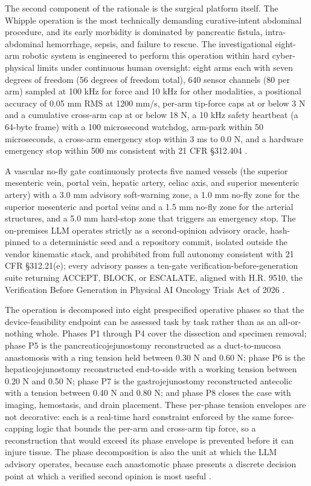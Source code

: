 The second component of the rationale is the surgical platform itself. The Whipple
operation is the most technically demanding curative-intent abdominal procedure, and
its early morbidity is dominated by pancreatic fistula, intra-abdominal hemorrhage,
sepsis, and failure to rescue. The investigational eight-arm robotic system is
engineered to perform this operation within hard cyber-physical limits under
continuous human oversight: eight arms each with seven degrees of freedom (56
degrees of freedom total), 640 sensor channels (80 per arm) sampled at 100 kHz for
force and 10 kHz for other modalities, a positional accuracy of 0.05 mm RMS at
1200 mm/s, per-arm tip-force caps at or below 3 N and a cumulative cross-arm cap at
or below 18 N, a 10 kHz safety heartbeat (a 64-byte frame) with a 100 microsecond
watchdog, arm-park within 50 microseconds, a cross-arm emergency stop within 3 ms to
0.0 N, and a hardware emergency stop within 500 ms consistent with 21 CFR
\S 312.404 \cite{onpremwhippl,daraxwhipple}. 

A vascular no-fly gate continuously
protects five named vessels (the superior mesenteric vein, portal vein, hepatic
artery, celiac axis, and superior mesenteric artery) with a 3.0 mm advisory
soft-warning zone, a 1.0 mm no-fly zone for the superior mesenteric and portal veins
and a 1.5 mm no-fly zone for the arterial structures, and a 5.0 mm hard-stop zone
that triggers an emergency stop. The on-premises LLM operates strictly as a
second-opinion advisory oracle, hash-pinned to a deterministic seed and a repository
commit, isolated outside the vendor kinematic stack, and prohibited from full
autonomy consistent with 21 CFR \S 312.21(e); every advisory passes a ten-gate
verification-before-generation suite returning ACCEPT, BLOCK, or ESCALATE, aligned
with H.R. 9510, the Verification Before Generation in Physical AI Oncology Trials
Act of 2026 \cite{congress9510,clintrustpai}.

The operation is decomposed into eight prespecified operative phases so that the
device-feasibility endpoint can be assessed task by task rather than as an
all-or-nothing whole. Phases P1 through P4 cover the dissection and specimen
removal; phase P5 is the pancreaticojejunostomy reconstructed as a duct-to-mucosa
anastomosis with a ring tension held between 0.30 N and 0.60 N; phase P6 is the
hepaticojejunostomy reconstructed end-to-side with a working tension between 0.20 N
and 0.50 N; phase P7 is the gastrojejunostomy reconstructed antecolic with a tension
between 0.40 N and 0.80 N; and phase P8 closes the case with imaging, hemostasis,
and drain placement. These per-phase tension envelopes are not decorative: each is a
real-time hard constraint enforced by the same force-capping logic that bounds the
per-arm and cross-arm tip force, so a reconstruction that would exceed its phase
envelope is prevented before it can injure tissue. The phase decomposition is also
the unit at which the LLM advisory operates, because each anastomotic phase presents
a discrete decision point at which a verified second opinion is most useful
\cite{onpremwhippl,daraxwhipple}.

